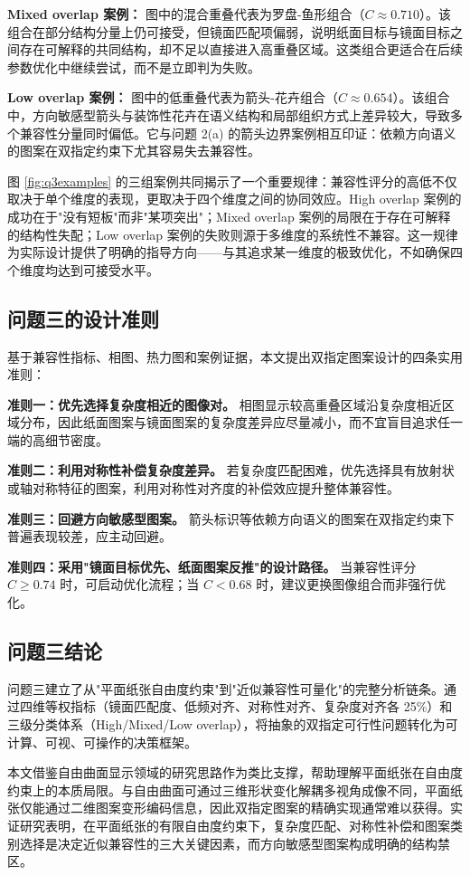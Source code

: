 \documentclass[a4paper,12pt]{ctexart}
\begin{document}
\par \textbf{Mixed overlap 案例：} 图中的混合重叠代表为罗盘-鱼形组合（$C\approx0.710$）。该组合在部分结构分量上仍可接受，但镜面匹配项偏弱，说明纸面目标与镜面目标之间存在可解释的共同结构，却不足以直接进入高重叠区域。这类组合更适合在后续参数优化中继续尝试，而不是立即判为失败。

\par \textbf{Low overlap 案例：} 图中的低重叠代表为箭头-花卉组合（$C\approx0.654$）。该组合中，方向敏感型箭头与装饰性花卉在语义结构和局部组织方式上差异较大，导致多个兼容性分量同时偏低。它与问题 2(a) 的箭头边界案例相互印证：依赖方向语义的图案在双指定约束下尤其容易失去兼容性。

\par 图 \ref{fig:q3examples} 的三组案例共同揭示了一个重要规律：兼容性评分的高低不仅取决于单个维度的表现，更取决于四个维度之间的协同效应。High overlap 案例的成功在于"没有短板"而非"某项突出"；Mixed overlap 案例的局限在于存在可解释的结构性失配；Low overlap 案例的失败则源于多维度的系统性不兼容。这一规律为实际设计提供了明确的指导方向——与其追求某一维度的极致优化，不如确保四个维度均达到可接受水平。

\subsection{问题三的设计准则}
\par 基于兼容性指标、相图、热力图和案例证据，本文提出双指定图案设计的四条实用准则：

\par \textbf{准则一：优先选择复杂度相近的图像对。} 相图显示较高重叠区域沿复杂度相近区域分布，因此纸面图案与镜面图案的复杂度差异应尽量减小，而不宜盲目追求任一端的高细节密度。

\par \textbf{准则二：利用对称性补偿复杂度差异。} 若复杂度匹配困难，优先选择具有放射状或轴对称特征的图案，利用对称性对齐度的补偿效应提升整体兼容性。

\par \textbf{准则三：回避方向敏感型图案。} 箭头标识等依赖方向语义的图案在双指定约束下普遍表现较差，应主动回避。

\par \textbf{准则四：采用"镜面目标优先、纸面图案反推"的设计路径。} 当兼容性评分 $C \geq 0.74$ 时，可启动优化流程；当 $C < 0.68$ 时，建议更换图像组合而非强行优化。

\subsection{问题三结论}
\par 问题三建立了从"平面纸张自由度约束"到"近似兼容性可量化"的完整分析链条。通过四维等权指标（镜面匹配度、低频对齐、对称性对齐、复杂度对齐各 25\%）和三级分类体系（High/Mixed/Low overlap），将抽象的双指定可行性问题转化为可计算、可视、可操作的决策框架。
\par 本文借鉴自由曲面显示领域的研究思路作为类比支撑，帮助理解平面纸张在自由度约束上的本质局限。与自由曲面可通过三维形状变化解耦多视角成像不同，平面纸张仅能通过二维图案变形编码信息，因此双指定图案的精确实现通常难以获得。实证研究表明，在平面纸张的有限自由度约束下，复杂度匹配、对称性补偿和图案类别选择是决定近似兼容性的三大关键因素，而方向敏感型图案构成明确的结构禁区。
\end{document}
